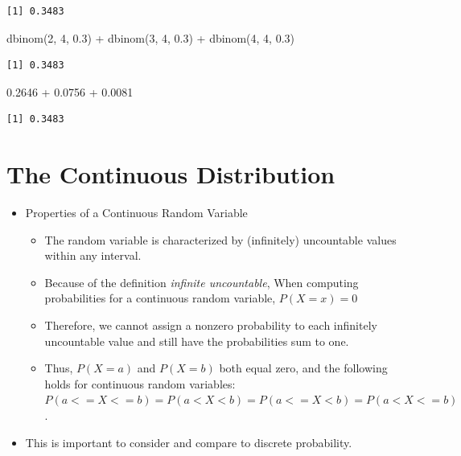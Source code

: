 \documentclass[
  letterpaper,
  DIV=11,
  numbers=noendperiod]{scrreprt}
\newenvironment{Shaded}{\begin{snugshade}}{\end{snugshade}}
\newcommand{\DecValTok}[1]{\textcolor[rgb]{0.68,0.00,0.00}{#1}}
\newcommand{\FloatTok}[1]{\textcolor[rgb]{0.68,0.00,0.00}{#1}}
\newcommand{\FunctionTok}[1]{\textcolor[rgb]{0.28,0.35,0.67}{#1}}
\newcommand{\NormalTok}[1]{\textcolor[rgb]{0.00,0.23,0.31}{#1}}
\newcommand{\SpecialCharTok}[1]{\textcolor[rgb]{0.37,0.37,0.37}{#1}}
\providecommand{\tightlist}{%
  \setlength{\itemsep}{0pt}\setlength{\parskip}{0pt}}\usepackage{longtable,booktabs,array}
\begin{document}
\begin{verbatim}
[1] 0.3483
\end{verbatim}

\begin{Shaded}
\begin{Highlighting}[]
\FunctionTok{dbinom}\NormalTok{(}\DecValTok{2}\NormalTok{, }\DecValTok{4}\NormalTok{, }\FloatTok{0.3}\NormalTok{) }\SpecialCharTok{+} \FunctionTok{dbinom}\NormalTok{(}\DecValTok{3}\NormalTok{, }\DecValTok{4}\NormalTok{, }\FloatTok{0.3}\NormalTok{) }\SpecialCharTok{+} \FunctionTok{dbinom}\NormalTok{(}\DecValTok{4}\NormalTok{, }\DecValTok{4}\NormalTok{, }\FloatTok{0.3}\NormalTok{)}
\end{Highlighting}
\end{Shaded}

\begin{verbatim}
[1] 0.3483
\end{verbatim}

\begin{Shaded}
\begin{Highlighting}[]
\FloatTok{0.2646} \SpecialCharTok{+} \FloatTok{0.0756} \SpecialCharTok{+} \FloatTok{0.0081}
\end{Highlighting}
\end{Shaded}

\begin{verbatim}
[1] 0.3483
\end{verbatim}


\chapter{The Continuous Distribution}\label{the-continuous-distribution}

\begin{itemize}
\tightlist
\item
  Properties of a Continuous Random Variable

  \begin{itemize}
  \tightlist
  \item
    The random variable is characterized by (infinitely) uncountable
    values within any interval.
  \item
    Because of the definition \emph{infinite uncountable}, When
    computing probabilities for a continuous random variable,
    \(P(X=x)=0\)
  \item
    Therefore, we cannot assign a nonzero probability to each infinitely
    uncountable value and still have the probabilities sum to one.
  \item
    Thus, \(P(X=a)\) and \(P(X=b)\) both equal zero, and the following
    holds for continuous random variables:
    \(P(a <= X <= b) = P(a < X < b) = P(a <= X < b) = P(a < X <= b)\).
  \end{itemize}
\item
  This is important to consider and compare to discrete probability.
\end{itemize}
\end{document}
